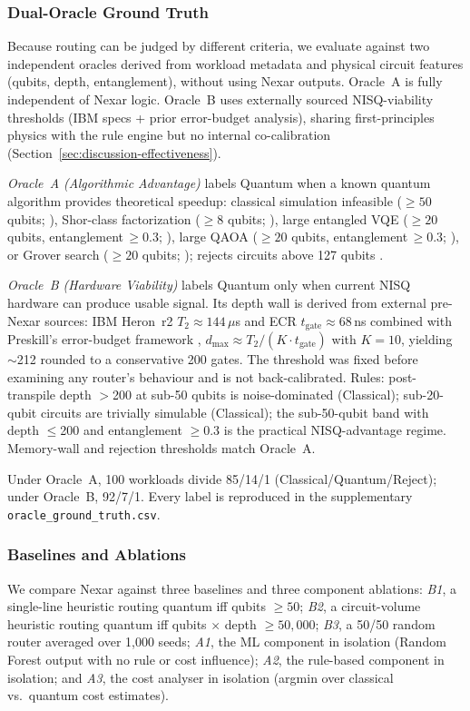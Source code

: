 \documentclass[10pt,conference]{IEEEtran}
\begin{document}
\subsubsection{Dual-Oracle Ground Truth}\label{sec:dual-oracle}
Because routing can be judged by different criteria, we evaluate against two independent oracles derived from workload metadata and physical circuit features (qubits, depth, entanglement), without using Nexar outputs. Oracle~A is fully independent of Nexar logic. Oracle~B uses externally sourced NISQ-viability thresholds (IBM specs + prior error-budget analysis), sharing first-principles physics with the rule engine but no internal co-calibration (Section~\ref{sec:discussion-effectiveness}).

\emph{Oracle~A (Algorithmic Advantage)} labels Quantum when a known quantum algorithm provides theoretical speedup: classical simulation infeasible ($\geq\!50$ qubits; \cite{preskill2018}), Shor-class factorization ($\geq\!8$ qubits; \cite{shor1997}), large entangled VQE ($\geq\!20$ qubits, entanglement$\,\geq\!0.3$; \cite{kandala2017}), large QAOA ($\geq\!20$ qubits, entanglement$\,\geq\!0.3$; \cite{farhi2014}), or Grover search ($\geq\!20$ qubits; \cite{grover1996}); rejects circuits above 127 qubits \cite{arute2019}.

\emph{Oracle~B (Hardware Viability)} labels Quantum only when current NISQ hardware can produce usable signal. Its depth wall is derived from external pre-Nexar sources: IBM Heron~r2 $T_2 \approx 144\,\mu$s and ECR $t_\text{gate} \approx 68$\,ns combined with Preskill's error-budget framework \cite{preskill2018}, $d_{\max} \approx T_2/(K \cdot t_\text{gate})$ with $K{=}10$, yielding $\sim$212 rounded to a conservative 200 gates. The threshold was fixed before examining any router's behaviour and is not back-calibrated. Rules: post-transpile depth $>$200 at sub-50 qubits is noise-dominated (Classical); sub-20-qubit circuits are trivially simulable (Classical); the sub-50-qubit band with depth $\leq$200 and entanglement $\geq$0.3 is the practical NISQ-advantage regime. Memory-wall and rejection thresholds match Oracle~A.

Under Oracle~A, 100 workloads divide 85/14/1 (Classical/Quantum/Reject); under Oracle~B, 92/7/1. Every label is reproduced in the supplementary \texttt{oracle\_ground\_truth.csv}.

\subsubsection{Baselines and Ablations}
We compare Nexar against three baselines and three component ablations:
\emph{B1}, a single-line heuristic routing quantum iff qubits $\geq 50$;
\emph{B2}, a circuit-volume heuristic routing quantum iff qubits $\times$ depth $\geq 50{,}000$;
\emph{B3}, a 50/50 random router averaged over 1{,}000 seeds;
\emph{A1}, the ML component in isolation (Random Forest output with no rule or cost influence);
\emph{A2}, the rule-based component in isolation; and
\emph{A3}, the cost analyser in isolation (argmin over classical vs.\ quantum cost estimates).
\end{document}
